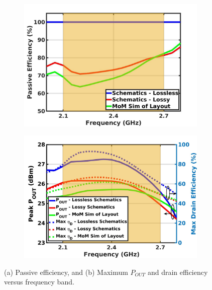 \documentclass[conference]{IEEEtran}
\begin{document}
\begin{figure}[!t]
\captionsetup{font=footnotesize}
\centering
\begin{subfigure}{0.24\textwidth}
\centering
\includegraphics[width=1\textwidth]{Images/Output_Network_Comp/Comp_PasEff_loss_layout_km0p69.pdf}
\caption{}
\label{fig:Comp_PasEff_loss_layout_km0p69}
\end{subfigure}
\begin{subfigure}{0.24\textwidth}
\includegraphics[width=1\textwidth]{Images/Output_Network_Comp/Comp_Pout_DE_loss_layout_km0p69.pdf}
\caption{}
\label{fig:Comp_Pout_DE_loss_layout_km0p69}
\end{subfigure}
\caption{(a) Passive efficiency, and (b) Maximum $P_{OUT}$ and drain efficiency versus frequency band.}
\label{fig:Comp_Pout_DE}
\vspace{-0.25in}
\end{figure}
\end{document}
